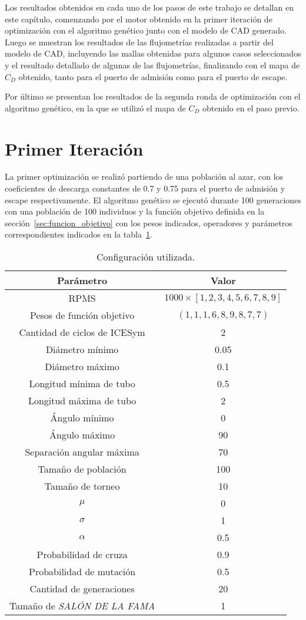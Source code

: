 Los resultados obtenidos en cada uno de los pasos de este trabajo se detallan en
este capítulo, comenzando por el motor obtenido en la primer iteración de
optimización con el algoritmo genético junto con el modelo de CAD generado.
%
Luego se muestran los resultados de las flujometrías realizadas a partir del
modelo de CAD, incluyendo las mallas obtenidas para algunos casos seleccionados
y el resultado detallado de algunas de las flujometrías, finalizando con el mapa
de $C_{D}$ obtenido, tanto para el puerto de admisión como para
el puerto de escape.

Por último se presentan los resultados de la segunda ronda de optimización con
el algoritmo genético, en la que se utilizó el mapa de $C_{D}$ obtenido en el
paso previo.

\section{Primer Iteración}
%
La primer optimización se realizó partiendo de una población al azar, con los
coeficientes de descarga constantes de 0.7 y 0.75 para el puerto de admisión y
escape respectivamente.
%
El algoritmo genético se ejecutó durante 100 generaciones con una población de
100 individuos y la función objetivo definida en la
sección~\ref{sec:funcion_objetivo} con los pesos indicados, operadores y
parámetros correspondientes indicados en la tabla~\ref{tab:config_genetico}.

\begin{table}[ht!]
  \centering
  \begin{tabular}{cc} \toprule
    Parámetro & Valor \\ \midrule
    RPMS & $1000\times[1, 2, 3, 4, 5, 6, 7, 8, 9]$ \\
    Pesos de función objetivo & $(1, 1, 1, 6, 8, 9, 8, 7, 7)$ \\
    Cantidad de ciclos de ICESym & 2 \\
    Diámetro mínimo & 0.05 \\
    Diámetro máximo & 0.1 \\
    Longitud mínima de tubo & 0.5 \\
    Longitud máxima de tubo & 2 \\
    Ángulo mínimo & 0 \\
    Ángulo máximo & 90 \\
    Separación angular máxima & 70 \\
    Tamaño de población & 100 \\
    Tamaño de torneo & 10 \\
    $\mu$ & 0 \\
    $\sigma$ & 1 \\
    $\alpha$ & 0.5 \\
    Probabilidad de cruza & 0.9 \\
    Probabilidad de mutación & 0.5 \\
    Cantidad de generaciones & 20 \\
    Tamaño de \emph{SALÓN DE LA FAMA} & 1 \\ \bottomrule
    \end{tabular}
  \caption{Configuración utilizada.}\label{tab:config_genetico}
\end{table}

